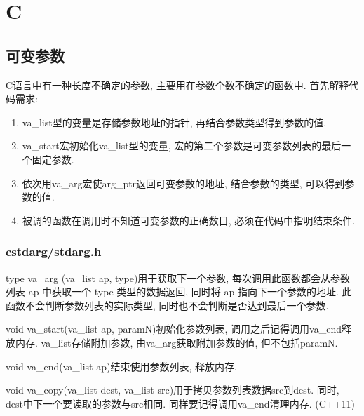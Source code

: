 \chapter{C}
\section{可变参数}
C语言中有一种长度不确定的参数, 主要用在参数个数不确定的函数中. 首先解释代码需求:

\begin{enumerate}[(1)]
\item va\_list型的变量是存储参数地址的指针, 再结合参数类型得到参数的值.
\item va\_start宏初始化va\_list型的变量, 宏的第二个参数是可变参数列表的最后一个固定参数.
\item 依次用va\_arg宏使arg\_ptr返回可变参数的地址, 结合参数的类型, 可以得到参数的值.
\item 被调的函数在调用时不知道可变参数的正确数目, 必须在代码中指明结束条件.
\end{enumerate}


\subsection{cstdarg/stdarg.h}
type va\_arg (va\_list ap, type)用于获取下一个参数, 每次调用此函数都会从参数列表 ap 中获取一个 type 类型的数据返回, 
同时将 ap 指向下一个参数的地址. 此函数不会判断参数列表的实际类型, 同时也不会判断是否达到最后一个参数.

void va\_start(va\_list ap, paramN)初始化参数列表, 调用之后记得调用va\_end释放内存. va\_list存储附加参数, 
由va\_arg获取附加参数的值, 但不包括paramN.

void va\_end(va\_list ap)结束使用参数列表, 释放内存.

void va\_copy(va\_list dest, va\_list src)用于拷贝参数列表数据src到dest. 同时,
dest中下一个要读取的参数与src相同. 同样要记得调用va\_end清理内存. (C++11)
